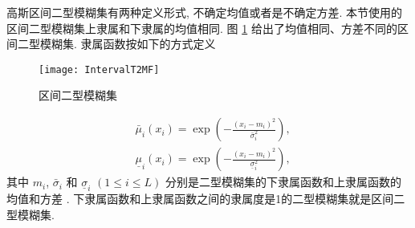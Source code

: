高斯区间二型模糊集有两种定义形式,  不确定均值或者是不确定方差. 本节使用的区间二型模糊集上隶属和下隶属的均值相同.  图 \ref{TFLN:fig1-2}  给出了均值相同、方差不同的区间二型模糊集. 隶属函数按如下的方式定义
\begin{figure} [!htp]
\begin{center}
\texttt{[image: IntervalT2MF]}
\end{center}
\caption{区间二型模糊集}
\label{TFLN:fig1-2}
\end{figure}
\begin{align}
  &\bar{\mu} _{i} (x_i)=\exp\left(- \frac{(x_i-m_{i} )^2} {\bar{\sigma} ^2_{i} }  \right),\label{IT2TSKNM_mu1} \\
  &\underline{\mu} _{i} (x_i)=\exp\left(- \frac{(x_i-m_{i} )^2} {\underline{\sigma} ^2_{i} }  \right),\label{IT2TSKNM_mu2}
\end{align}
其中 $m_{i} $, $\bar{\sigma} _{i} $ 和 $\underline{\sigma} _{i} $ $(1\leq i\leq L)$ 分别是二型模糊集的下隶属函数和上隶属函数的均值和方差 . 下隶属函数和上隶属函数之间的隶属度是1的二型模糊集就是区间二型模糊集.

